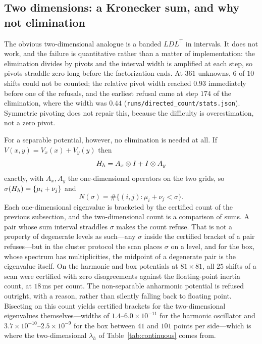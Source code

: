 \subsection{Two dimensions: a Kronecker sum, and why not elimination}

The obvious two-dimensional analogue is a banded $LDL^\top$ in intervals. It
does not work, and the failure is quantitative rather than a matter of
implementation: the elimination divides by pivots and the interval width is
amplified at each step, so pivots straddle zero long before the factorization
ends. At $361$ unknowns, $6$ of $10$ shifts could not be counted; the relative
pivot width reached $0.93$ immediately before one of the refusals, and the
earliest refusal came at step $174$ of the elimination, where the width was
$0.44$ (\texttt{runs/directed\_count/stats.json}). Symmetric pivoting does
not repair this, because the difficulty is overestimation, not a zero pivot.

For a separable potential, however, no elimination is needed at all. If
$V(x,y)=V_x(x)+V_y(y)$ then
\begin{equation}
  H_h = A_x\otimes I + I\otimes A_y
  \label{eq:kron}
\end{equation}
exactly, with $A_x,A_y$ the one-dimensional operators on the two grids, so
$\sigma(H_h)=\{\mu_i+\nu_j\}$ and
\begin{equation}
  N(\sigma) = \#\{(i,j): \mu_i+\nu_j < \sigma\}.
\end{equation}
Each one-dimensional eigenvalue is bracketed by the certified count of the
previous subsection, and the two-dimensional count is a comparison of sums. A pair whose sum interval straddles $\sigma$ makes the count refuse. That
is not a property of degenerate levels as such---any $\sigma$ inside the
certified bracket of a pair refuses---but in the cluster protocol the scan
places $\sigma$ on a level, and for the box, whose spectrum has
multiplicities, the midpoint of a degenerate pair is the eigenvalue
itself. On the harmonic and box potentials at $81\times81$, all
$25$ shifts of a scan were certified with zero disagreements against the
floating-point inertia count, at $18$\,ms per count. The non-separable
anharmonic potential is refused outright, with a reason, rather than
silently falling back to floating point. Bisecting on this count yields
certified brackets for the two-dimensional eigenvalues themselves---widths
of $1.4$--$6.0\times10^{-11}$ for the harmonic oscillator and
$3.7\times10^{-10}$--$2.5\times10^{-9}$ for the box between $41$ and $101$
points per side---which is where the two-dimensional $\lambda_h$ of
Table~\ref{tab:continuous} comes from.

